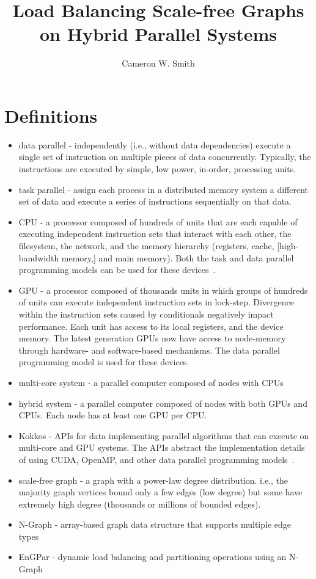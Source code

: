 \documentclass{article}
\title{Load Balancing Scale-free Graphs on Hybrid Parallel Systems}
\author{Cameron W. Smith}
\begin{document}
\maketitle
\section{Definitions}
\begin{itemize}
  \item data parallel - independently (i.e., without data dependencies) execute
    a single set of instruction on multiple pieces of data concurrently.
    Typically, the instructions are executed by simple, low power, in-order,
    processing units.
  \item task parallel - assign each process in a distributed memory system a
    different set of data and execute a series of instructions sequentially on
    that data.
  \item CPU - a processor composed of hundreds of units that are
    each capable of executing independent instruction sets that interact with
    each other, the filesystem, the network, and the memory hierarchy
    (registers, cache, [high-bandwidth memory,] and main memory).
    Both the task and data parallel programming models can be used for these
    devices~\cite{jeffers2016intel}.
  \item GPU - a processor composed of thousands units in which groups of
    hundreds of units can execute independent instruction sets in lock-step.
    Divergence within the instruction sets caused by conditionals negatively
    impact performance.
    Each unit has access to its local registers, and the device memory.
    The latest generation GPUs now have access to node-memory through hardware-
    and software-based mechanisms.
    The data parallel programming model is used for these devices.
  \item multi-core system - a parallel computer composed of nodes with CPUs
  \item hybrid system - a parallel computer composed of nodes with
    both GPUs and CPUs.
    Each node has at least one GPU per CPU.
  \item Kokkos - APIs for data implementing parallel algorithms that can execute on
    multi-core and GPU systems.  The APIs abstract the implementation details of
    using CUDA, OpenMP, and other data parallel programming
    models~\cite{edwards2013kokkos}.
  \item scale-free graph - a graph with a power-law degree distribution. i.e.,
    the majority graph vertices bound only a few edges (low degree) but some
    have extremely high degree (thousands or millions of bounded edges).
  \item N-Graph - array-based graph data structure that supports multiple edge types
  \item EnGPar - dynamic load balancing and partitioning operations using an N-Graph
\end{itemize}
\end{document}
